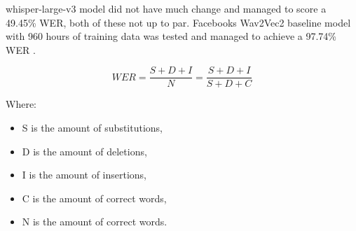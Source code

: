 \documentclass[12pt]{article}
\begin{document}
whisper-large-v3 model did not have much change and managed to score a 49.45\% WER, both of these not up to par. Facebooks Wav2Vec2 baseline model with 960 hours of training data was tested and managed to achieve a 97.74\% WER \cite{facebook-wav2vec}. 

\begin{equation}
\label{eq:WER}
WER = \frac{S + D + I}{N} = \frac{S + D + I}{S + D + C}
\end{equation}

Where:
\begin{itemize}
    \item S is the amount of substitutions,
    \item D is the amount of deletions,
    \item I is the amount of insertions,
    \item C is the amount of correct words,
    \item N is the amount of correct words.
\end{itemize}
\end{document}
